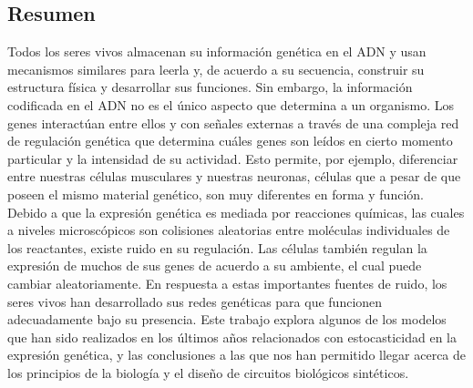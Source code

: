 \documentclass[12pt,letterpaper,twoside,openright]{report}
\begin{document}
\subsection*{Resumen}
\vspace{-0.5cm}
\begin{singlespacing}
Todos los seres vivos almacenan su informaci\'on gen\'etica en el ADN y usan mecanismos similares para leerla y, de acuerdo a su secuencia, construir su estructura f\'isica y desarrollar sus funciones. Sin embargo, la informaci\'on codificada en el ADN no es el \'unico aspecto que determina a un organismo. Los genes interact\'uan entre ellos y con se\~nales externas a trav\'es de una compleja red de regulaci\'on gen\'etica que determina cu\'ales genes son le\'idos en cierto momento particular y la intensidad de su actividad. Esto permite, por ejemplo, diferenciar entre nuestras c\'elulas musculares y nuestras neuronas, c\'elulas que a pesar de que poseen el mismo material gen\'etico, son muy diferentes en forma y funci\'on. Debido a que la expresi\'on gen\'etica es mediada por reacciones qu\'imicas, las cuales a niveles microsc\'opicos son colisiones aleatorias entre mol\'eculas individuales de los reactantes, existe ruido en su regulaci\'on. Las c\'elulas tambi\'en regulan la expresi\'on de muchos de sus genes de acuerdo a su ambiente, el cual puede cambiar aleatoriamente. En respuesta a estas importantes fuentes de ruido, los seres vivos han desarrollado sus redes gen\'eticas para que funcionen adecuadamente bajo su presencia. Este trabajo explora algunos de los modelos que han sido realizados en los \'ultimos a\~nos relacionados con estocasticidad en la expresi\'on gen\'etica, y las conclusiones a las que nos han permitido llegar acerca de los principios de la biolog\'ia y el dise\~no de circuitos biol\'ogicos sint\'eticos.\par
\end{singlespacing}
\newpage
\tableofcontents
\newpage
\listoffigures

\raggedbottom








\printbibliography
{}
\end{document}
